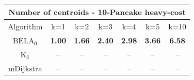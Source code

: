 \begin{tabular}{c|cccccc}\toprule
\multicolumn{7}{c}{Number of centroids - 10-Pancake heavy-cost}\\ \midrule
Algorithm & k=1 & k=2 & k=3 & k=4 & k=5 & k=10 \\ \midrule
BELA$_0$ & \textbf{1.00} & \textbf{1.66} & \textbf{2.40} & \textbf{2.98} & \textbf{3.66} & \textbf{6.58} \\
K$_0$ & -- & -- & -- & -- & -- & -- \\
mDijkstra & -- & -- & -- & -- & -- & -- \\ \bottomrule 
\end{tabular}
